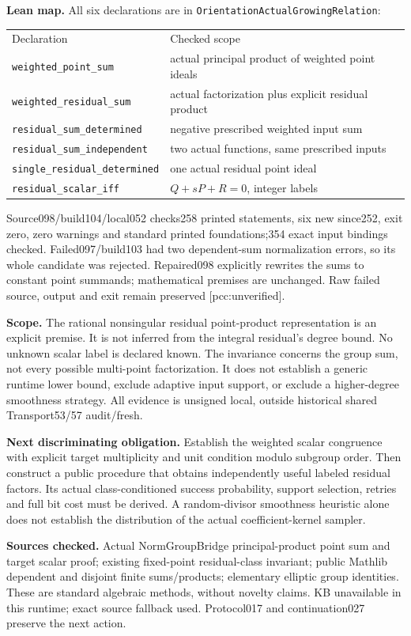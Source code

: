 \documentclass[11pt]{article}
\begin{document}
\textbf{Lean map.}
All six declarations are in \texttt{OrientationActualGrowingRelation}:
\begin{center}\begin{tabular}{ll}
Declaration&Checked scope\\
\texttt{weighted\_point\_sum}&actual principal product of weighted point ideals\\
\texttt{weighted\_residual\_sum}&actual factorization plus explicit residual product\\
\texttt{residual\_sum\_determined}&negative prescribed weighted input sum\\
\texttt{residual\_sum\_independent}&two actual functions, same prescribed inputs\\
\texttt{single\_residual\_determined}&one actual residual point ideal\\
\texttt{residual\_scalar\_iff}&\(Q+sP+R=0\), integer labels
\end{tabular}\end{center}
Source098/build104/local052 checks258 printed statements, six new since252,
exit zero, zero warnings and standard printed foundations;354 exact input
bindings checked. Failed097/build103 had two dependent-sum normalization
errors, so its whole candidate was rejected. Repaired098 explicitly rewrites
the sums to constant point summands; mathematical premises are unchanged.
Raw failed source, output and exit remain preserved [pcc:unverified].

\textbf{Scope.}
The rational nonsingular residual point-product representation is an explicit
premise. It is not inferred from the integral residual's degree bound.
No unknown scalar label is declared known. The invariance concerns the group
sum, not every possible multi-point factorization. It does not establish a
generic runtime lower bound, exclude adaptive input support, or exclude a
higher-degree smoothness strategy. All evidence is unsigned local, outside
historical shared Transport53/57 audit/fresh.

\textbf{Next discriminating obligation.}
Establish the weighted scalar congruence with explicit target multiplicity
and unit condition modulo subgroup order. Then construct a public procedure
that obtains independently useful labeled residual factors. Its actual
class-conditioned success probability, support selection, retries and full
bit cost must be derived. A random-divisor smoothness heuristic alone does
not establish the distribution of the actual coefficient-kernel sampler.

\textbf{Sources checked.}
Actual NormGroupBridge principal-product point sum and target scalar proof;
existing fixed-point residual-class invariant; public Mathlib dependent and
disjoint finite sums/products; elementary elliptic group identities. These
are standard algebraic methods, without novelty claims. KB unavailable in
this runtime; exact source fallback used. Protocol017 and continuation027
preserve the next action.
\end{document}
